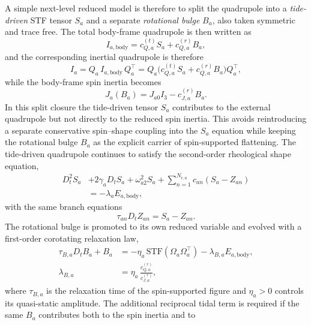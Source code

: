 \documentclass[journal, a4paper]{IEEEtran}
\begin{document}
A simple next-level reduced model is therefore to split the quadrupole into a
\emph{tide-driven} STF tensor $S_a$ and a separate \emph{rotational bulge}
$B_a$, also taken symmetric and trace free. The total body-frame quadrupole is
then written as
\begin{equation}
I_{a,\mathrm{body}} = c_{Q,a}^{(t)} S_a + c_{Q,a}^{(r)} B_a,
\end{equation}
and the corresponding inertial quadrupole is therefore
\begin{equation}
I_a = Q_a\,I_{a,\mathrm{body}}\,Q_a^\top
= Q_a\bigl(c_{Q,a}^{(t)} S_a + c_{Q,a}^{(r)} B_a\bigr)Q_a^\top,
\label{eq:IquadSplit}
\end{equation}
while the body-frame spin inertia becomes
\begin{equation}
J_a(B_a) = J_{a0} I_3 - c_{J,a}^{(r)} B_a.
\label{eq:JSsplitB}
\end{equation}
In this split closure the tide-driven tensor $S_a$ contributes to the external
quadrupole but not directly to the reduced spin inertia. This avoids
reintroducing a separate conservative spin--shape coupling into the $S_a$
equation while keeping the rotational bulge $B_a$ as the explicit carrier of
spin-supported flattening.
The tide-driven quadrupole continues to satisfy the second-order rheological
shape equation,
\begin{align}
D_t^2 S_a
&+
2\gamma_a D_t S_a
+
\omega_{a2}^2 S_a
+
\sum_{n=1}^{N_{\mathrm{r},a}} c_{an}(S_a-Z_{an})
\nonumber\\
&= -\lambda_a E_{a,\mathrm{body}},
\label{eq:Seqsplit}
\end{align}
with the same branch equations
\begin{equation}
\tau_{an} D_t Z_{an} = S_a - Z_{an}.
\label{eq:Zsplit}
\end{equation}
The rotational bulge is promoted to its own reduced variable and evolved with a
first-order corotating relaxation law,
\begin{subequations}
\label{eq:Bquad}
\begin{align}
\tau_{B,a} D_t B_a + B_a &= -\eta_a\,\mathrm{STF}(\Omega_a\Omega_a^\top)
-\lambda_{B,a} E_{a,\mathrm{body}},
 \\
\lambda_{B,a}&=\eta_a\,\frac{c_{Q,a}^{(r)}}{c_{J,a}^{(r)}},
\end{align}
\end{subequations}
where $\tau_{B,a}$ is the relaxation time of the spin-supported figure and
$\eta_a>0$ controls its quasi-static amplitude. The additional reciprocal tidal
term is required if the same $B_a$ contributes both to the spin inertia and to
\end{document}
